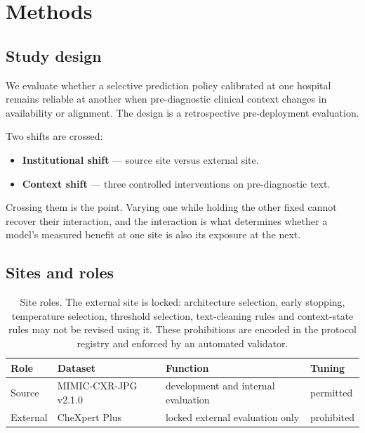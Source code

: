 \section{Methods}
\label{sec:methods}

\subsection{Study design}

We evaluate whether a selective prediction policy calibrated at one hospital
remains reliable at another when pre-diagnostic clinical context changes in
availability or alignment. The design is a retrospective pre-deployment
evaluation.

Two shifts are crossed:

\begin{itemize}
  \item \textbf{Institutional shift} --- source site versus external site.
  \item \textbf{Context shift} --- three controlled interventions on
    pre-diagnostic text.
\end{itemize}

Crossing them is the point. Varying one while holding the other fixed cannot
recover their interaction, and the interaction is what determines whether a
model's measured benefit at one site is also its exposure at the next.

\subsection{Sites and roles}

\begin{table}[htbp]
\centering
\caption{Site roles. The external site is locked: architecture selection, early
stopping, temperature selection, threshold selection, text-cleaning rules and
context-state rules may not be revised using it. These prohibitions are encoded
in the protocol registry and enforced by an automated validator.}
\label{tab:sites}
\begin{tabular}{llll}
\toprule
Role & Dataset & Function & Tuning \\
\midrule
Source   & MIMIC-CXR-JPG v2.1.0~\cite{johnson2019mimiccxr}
         & development and internal evaluation & permitted \\
External & CheXpert Plus~\cite{chexpertplus2024}
         & locked external evaluation only & prohibited \\
\bottomrule
\end{tabular}
\end{table}

